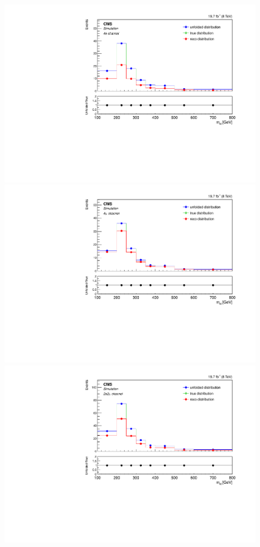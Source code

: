 \begin{figure}[hbtp]
\begin{center}
     \includegraphics[width=0.8\cmsFigWidth]{Figures/Unfolding/MCTests/Mass_ZZTo4e_PowMatrix_PowDistr_FullSample_fr}     
    \includegraphics[width=0.8\cmsFigWidth]{Figures/Unfolding/MCTests/Mass_ZZTo4m_PowMatrix_PowDistr_FullSample_fr}     
    \includegraphics[width=0.8\cmsFigWidth]{Figures/Unfolding/MCTests/Mass_ZZTo2e2m_PowMatrix_PowDistr_FullSample_fr}      

\end{center}
\end{figure}

